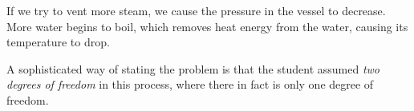 If we try to vent more steam, we cause the pressure in the vessel to decrease.  More water begins to boil, which removes heat energy from the water, causing its temperature to drop.

\vskip 10pt

A sophisticated way of stating the problem is that the student assumed {\it two degrees of freedom} in this process, where there in fact is only one degree of freedom.












